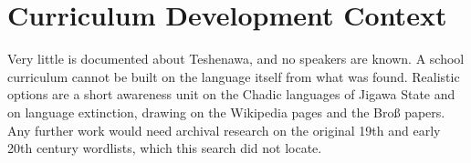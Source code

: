\documentclass[12pt]{article}
\begin{document}
\section{Curriculum Development Context}
Very little is documented about Teshenawa, and no speakers are known. A school curriculum cannot be built on the language itself from what was found. Realistic options are a short awareness unit on the Chadic languages of Jigawa State and on language extinction, drawing on the Wikipedia pages and the Bro\ss{} papers. Any further work would need archival research on the original 19th and early 20th century wordlists, which this search did not locate.
\end{document}

